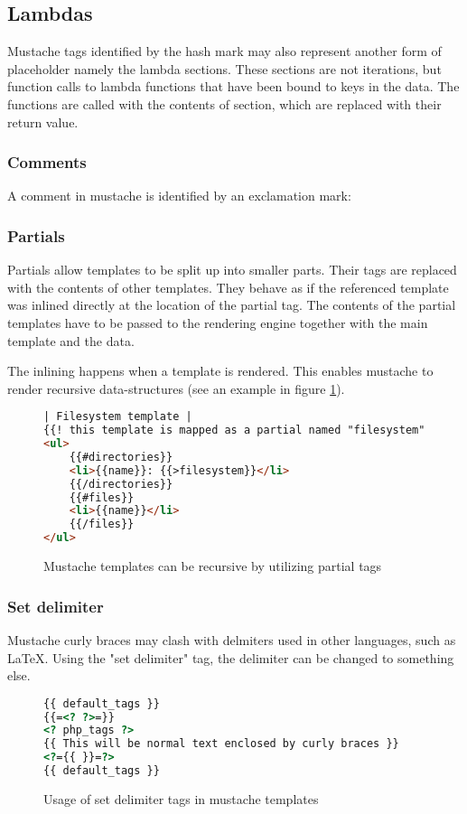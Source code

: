 \subsection{Lambdas}
Mustache tags identified by the hash mark may also represent another form of
placeholder namely the lambda sections. These sections are not iterations, but
function calls to lambda functions that have been bound to keys in the data.
The functions are called with the contents of section, which are replaced
with their return value.

\subsubsection{Comments}
A comment in mustache is identified by an exclamation mark:

\subsubsection{Partials}
Partials allow templates to be split up into smaller parts. Their tags are
replaced with the contents of other templates. They behave as if the referenced
template was inlined directly at the location of the partial tag.
The contents of the partial templates have to be passed to the rendering engine
together with the main template and the data.

The inlining happens when a template is rendered. This enables mustache to
render recursive data-structures
(see an example in figure \ref{fig:partial.mustache}).
\begin{figure}
	\centering
	\caption{Mustache templates can be recursive by utilizing partial tags}
	\label{fig:partial.mustache}
	\begin{lstlisting}[language=HTML]
| Filesystem template |
{{! this template is mapped as a partial named "filesystem" }}
<ul>
	{{#directories}}
	<li>{{name}}: {{>filesystem}}</li>
	{{/directories}}
	{{#files}}
	<li>{{name}}</li>
	{{/files}}
</ul>
	\end{lstlisting}
\end{figure}

\subsubsection{Set delimiter}
Mustache curly braces may clash with delmiters used in other languages,
such as LaTeX. Using the "set delimiter" tag, the delimiter can be changed to
something else.
\begin{figure}
	\centering
	\caption{Usage of set delimiter tags in mustache templates}
	\label{fig:set-delim.mustache}
	\begin{lstlisting}[language=HTML]
{{ default_tags }}
{{=<? ?>=}}
<? php_tags ?>
{{ This will be normal text enclosed by curly braces }}
<?={{ }}=?>
{{ default_tags }}
	\end{lstlisting}
\end{figure}

